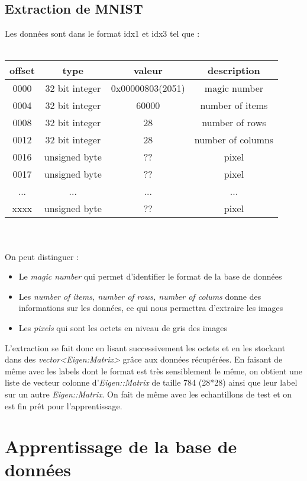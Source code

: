 \subsection{Extraction de MNIST} 
Les données sont dans le format idx1 et idx3 tel que : \\ \\
\begin{tabular}{|c | c | c | c|}
\hline
\textbf{offset} & \textbf{type} & \textbf{valeur} & \textbf{description} \\
\hline
0000 & 32 bit integer & 0x00000803(2051) & magic number\\
0004 & 32 bit integer & 60000 & number of items\\
0008 & 32 bit integer & 28 & number of rows \\
0012 & 32 bit integer & 28 & number of columns \\
0016 & unsigned byte & ?? & pixel\\
0017 & unsigned byte & ?? & pixel\\
... & ... & ... & ... \\
xxxx  &  unsigned byte & ?? & pixel\\
\hline
\end{tabular} \\ \\
On peut distinguer :
\begin{itemize}
  \item Le \textit{magic number} qui permet d'identifier le format de la base de données
  \item Les \textit{number of items, number of rows, number of colums} donne des informations sur les données, ce qui nous permettra d'extraire les images
  \item Les \textit{pixels} qui sont les octets en niveau de gris des images
\end{itemize} 
L'extraction se fait donc en lisant successivement les octets et en les stockant dans des \textit{vector<Eigen:Matrix>} grâce aux données récupérées. En faisant de même avec les labels dont le format est très sensiblement le même, on obtient une liste de vecteur colonne d'\textit{Eigen::Matrix} de taille 784 (28*28) ainsi que leur label sur un autre \textit{Eigen::Matrix}. On fait de même avec les echantillons de test et on est fin prêt pour l'apprentissage.

\section{Apprentissage de la base de données}

